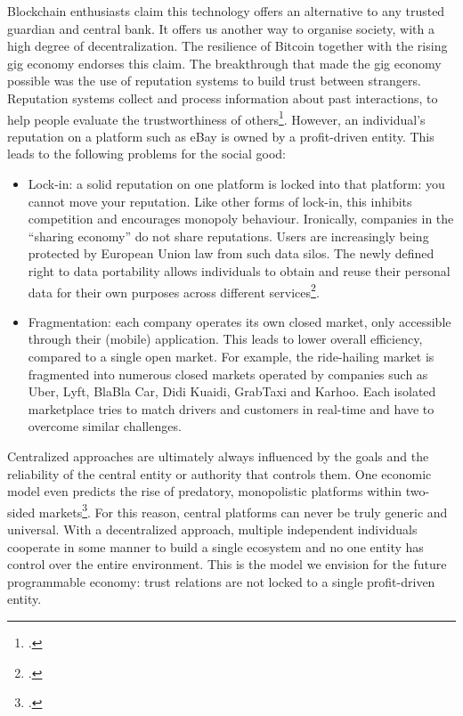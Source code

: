 \documentclass[USenglish]{article}
\begin{document}
Blockchain enthusiasts claim this technology offers an alternative to any trusted guardian and central bank.
It offers us another way to organise society, with a high degree of decentralization.
The resilience of Bitcoin together with the rising gig economy endorses this claim.
The breakthrough that made the gig economy possible was the use of reputation systems to build trust between strangers.
Reputation systems collect and process information about past interactions, to help people evaluate the trustworthiness of others\footcite{resnick2002trust}.
However, an individual’s reputation on a platform such as eBay is owned by a profit-driven entity.
This leads to the following problems for the social good:
\begin{itemize}
	\item Lock-in: a solid reputation on one platform is locked into that platform: you cannot move your reputation. Like other forms of lock-in, this inhibits competition and encourages monopoly behaviour. Ironically, companies in the \enquote{sharing economy} do not share reputations. Users are increasingly being protected by European Union law from such data silos. The newly defined right to data portability allows individuals to obtain and reuse their personal data for their own purposes across different services\footcite{dataportabilityeu}.
	\item Fragmentation: each company operates its own closed market, only accessible through their (mobile) application. This leads to lower overall efficiency, compared to a single open market. For example, the ride-hailing market is fragmented into numerous closed markets operated by companies such as Uber, Lyft, BlaBla Car, Didi Kuaidi, GrabTaxi and Karhoo. Each isolated marketplace tries to match drivers and customers in real-time and have to overcome similar challenges.
\end{itemize}
Centralized approaches are ultimately always influenced by the goals and the reliability of the central entity or authority that controls them. 
One economic model even predicts the rise of predatory, monopolistic platforms within two-sided markets\footcite{loertscher2016predatory}.
For this reason, central platforms can never be truly generic and universal. 
With a decentralized approach, multiple independent individuals cooperate in some manner to build a single ecosystem and no one entity has control over the entire environment.
This is the model we envision for the future programmable economy: trust relations are not locked to a single profit-driven entity.
\end{document}

